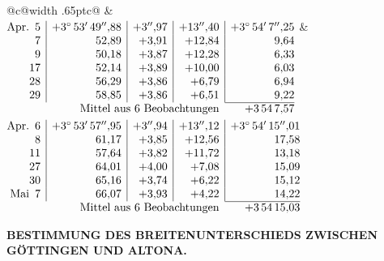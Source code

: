 \noindent\begin{tabular}{@{}c@{\hspace{.4em}\vrule width .65pt\hspace{.4em}}c@{}}
 &
 \\[.18ex]
\(\begin{array}[t]{@{}r|r|r|r|r@{}}
\text{Apr.}\enspace 5 & +3^\circ\,53'\,49''{,}88 & +3''{,}97 & +13''{,}40 & +3^\circ\,54'\,7''{,}25\\
7 & 52{,}89 & +3{,}91 & +12{,}84 & 9{,}64\\
9 & 50{,}18 & +3{,}87 & +12{,}28 & 6{,}33\\
17 & 52{,}14 & +3{,}89 & +10{,}00 & 6{,}03\\
28 & 56{,}29 & +3{,}86 & +6{,}79 & 6{,}94\\
29 & 58{,}85 & +3{,}86 & +6{,}51 & 9{,}22\\
\cline{5-5}
\multicolumn{4}{r}{\text{Mittel aus 6 Beobachtungen}} & +3\,54\,7{,}57
\end{array}\)
&
\(\begin{array}[t]{@{}r|r|r|r|r@{}}
\text{Apr.}\enspace 6 & +3^\circ\,53'\,57''{,}95 & +3''{,}94 & +13''{,}12 & +3^\circ\,54'\,15''{,}01\\
8 & 61{,}17 & +3{,}85 & +12{,}56 & 17{,}58\\
11 & 57{,}64 & +3{,}82 & +11{,}72 & 13{,}18\\
27 & 64{,}01 & +4{,}00 & +7{,}08 & 15{,}09\\
30 & 65{,}16 & +3{,}74 & +6{,}22 & 15{,}12\\
\text{Mai}\enspace 7 & 66{,}07 & +3{,}93 & +4{,}22 & 14{,}22\\
\cline{5-5}
\multicolumn{4}{r}{\text{Mittel aus 6 Beobachtungen}} & +3\,54\,15{,}03
\end{array}\)
\end{tabular}\par\medskip

\par\clearpage
\noindent{}\parbox[t]{\dimexpr\linewidth-24mm\relax}{\centering\scriptsize\bfseries BESTIMMUNG DES BREITENUNTERSCHIEDS ZWISCHEN GÖTTINGEN UND ALTONA.}\makebox[12mm][r]{}\par\medskip

